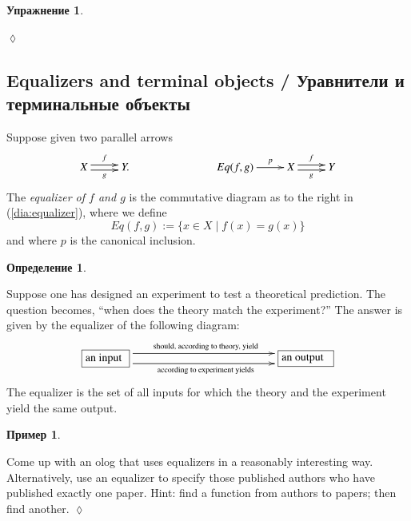 \documentclass[a4paper]{book}
\def\tn{\textnormal}
\def\|{{\;|\;}}
\newcommand{\obox}[3]{\stackrel{#1}{\fbox{\parbox{#2}{#3}}}}
\theoremstyle{myth}
\newtheorem{exampleENG}[envENG]{\begin{english}Example\end{english}}
\newtheorem{excENG}[envENG]{\begin{english}Exercise\end{english}}
\newtheorem{definitionENG}[envENG]{\begin{english}Definition\end{english}}
\newenvironment{exerciseENG}{\begin{excENG}}{\hspace*{\fill}$\lozenge$\end{excENG}}
\newtheorem{exampleRUS}[envRUS]{Пример}
\newtheorem{excRUS}[envRUS]{Упражнение}
\newtheorem{definitionRUS}[envRUS]{Определение}
\newenvironment{exerciseRUS}{\begin{excRUS}}{\hspace*{\fill}$\lozenge$\end{excRUS}}
\begin{document}
\begin{russian}
\begin{exerciseRUS}~
 
\end{exerciseRUS}


\subsection{Equalizers and terminal objects / Уравнители и терминальные объекты}

\begin{definitionENG}\label{def:equalizer}
Suppose given two parallel arrows 
\begin{align}\label{dia:equalizer}
\xymatrix{X\ar@<.5ex>[r]^f\ar@<-.5ex>[r]_g&Y.}\hspace{1in}\xymatrix{Eq(f,g)\ar[r]^-p&X\ar@<.5ex>[r]^f\ar@<-.5ex>[r]_g&Y}
\end{align}
The {\em equalizer of $f$ and $g$} is the commutative diagram as to the right in (\ref{dia:equalizer}), where we define $$Eq(f,g):=\{x\in X\|f(x)=g(x)\}$$ and where $p$ is the canonical inclusion.
\end{definitionENG}

\begin{definitionRUS}\label{def:equalizer}
 
\end{definitionRUS}

\begin{exampleENG}
Suppose one has designed an experiment to test a theoretical prediction. The question becomes, “when does the theory match the experiment?” The answer is given by the equalizer of the following diagram:
$$\xymatrix{
\obox{}{.5in}{an input}\ar@<1ex>[rr]^{\tn{should, according to theory, yield}}\ar@<-1ex>[rr]_{\tn{according to experiment yields}}&\hspace{1in}&\obox{}{.6in}{an output}
}$$
The equalizer is the set of all inputs for which the theory and the experiment yield the same output.
\end{exampleENG}

\begin{exampleRUS}
 
\end{exampleRUS}

\begin{exerciseENG}
Come up with an olog that uses equalizers in a reasonably interesting way. Alternatively, use an equalizer to specify those published authors who have published exactly one paper. Hint: find a function from authors to papers; then find another.
\end{exerciseENG}


\end{russian}
\end{document}
